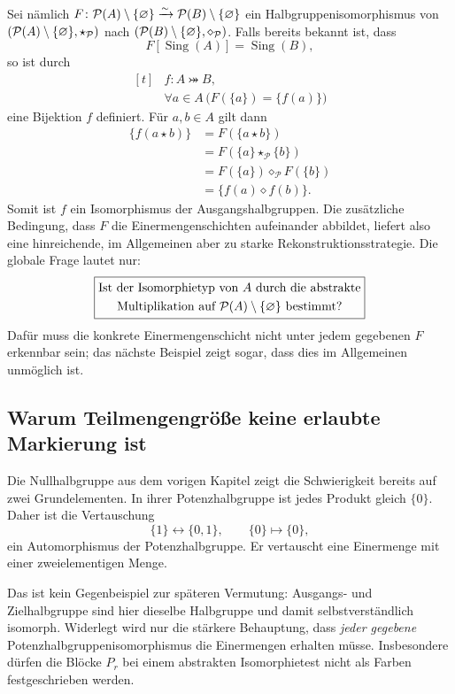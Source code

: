 \documentclass[main.tex]{subfiles}
\begin{document}
Sei nämlich \(F\colon\mathcal{P}(A)\setminus\{\varnothing\}\xrightarrow{\sim}\mathcal{P}(B)\setminus\{\varnothing\}\) ein
Halbgruppenisomorphismus von
\((\mathcal{P}(A)\setminus\{\varnothing\},\star_{\mathcal P})\) nach
\((\mathcal{P}(B)\setminus\{\varnothing\},\diamond_{\mathcal P})\).  Falls bereits bekannt ist, dass
\[
  F[\operatorname{Sing}(A)]=\operatorname{Sing}(B),
\]
so ist durch
\[
  \begin{aligned}[t]
    &f\colon A\bij B,\\[-2pt]
    &\forall a\in A\,\bigl(F(\{a\})=\{f(a)\}\bigr)
  \end{aligned}
\]
eine Bijektion \(f\) definiert.  Für \(a,b\in A\) gilt dann
\[
\begin{aligned}
  \{f(a\star b)\}
  &=F(\{a\star b\})\\
  &=F(\{a\}\star_{\mathcal P}\{b\})\\
  &=F(\{a\})\diamond_{\mathcal P}F(\{b\})\\
  &=\{f(a)\diamond f(b)\}.
\end{aligned}
\]
Somit ist \(f\) ein Isomorphismus der Ausgangshalbgruppen.  Die zusätzliche
Bedingung, dass \(F\) die Einermengenschichten aufeinander abbildet, liefert
also eine hinreichende, im Allgemeinen aber zu starke
Rekonstruktionsstrategie.  Die globale Frage lautet nur:
\[
\boxed{
\begin{gathered}
\text{Ist der Isomorphietyp von }A\text{ durch die abstrakte}\\
\text{Multiplikation auf }\mathcal{P}(A)\setminus\{\varnothing\}\text{ bestimmt?}
\end{gathered}}
\]
Dafür muss die konkrete Einermengenschicht nicht unter jedem gegebenen \(F\)
erkennbar sein; das nächste Beispiel zeigt sogar, dass dies im Allgemeinen
unmöglich ist.

\subsection{Warum Teilmengengröße keine erlaubte Markierung ist}

Die Nullhalbgruppe aus dem vorigen Kapitel zeigt die Schwierigkeit bereits
auf zwei Grundelementen.  In ihrer Potenzhalbgruppe ist jedes Produkt gleich
\(\{0\}\).  Daher ist die Vertauschung
\[
  \{1\}\longleftrightarrow\{0,1\},
  \qquad
  \{0\}\longmapsto\{0\},
\]
ein Automorphismus der Potenzhalbgruppe.  Er vertauscht eine Einermenge mit
einer zweielementigen Menge.

Das ist kein Gegenbeispiel zur späteren Vermutung: Ausgangs- und
Zielhalbgruppe sind hier dieselbe Halbgruppe und damit selbstverständlich
isomorph.  Widerlegt wird nur die stärkere Behauptung, dass
\emph{jeder gegebene} Potenzhalbgruppenisomorphismus die Einermengen erhalten
müsse.  Insbesondere dürfen die Blöcke \(P_r\) bei einem abstrakten
Isomorphietest nicht als Farben festgeschrieben werden.
\end{document}
